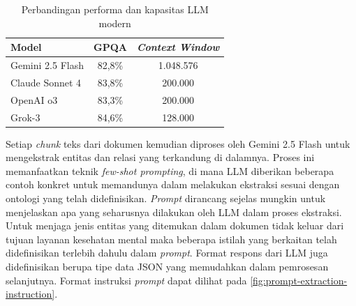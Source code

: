 \begin{table}[ht]
	\centering
	\label{tab:llm-comparison}
	\caption{Perbandingan performa dan kapasitas LLM modern}
	\begin{tabular}{|l|c|c|}
		\hline
		\textbf{Model}   & \textbf{GPQA} & \textbf{\textit{Context Window}} \\
		\hline \hline
		Gemini 2.5 Flash & 82,8\%        & 1.048.576                        \\
		\hline
		Claude Sonnet 4  & 83,8\%        & 200.000                          \\
		\hline
		OpenAI o3        & 83,3\%        & 200.000                          \\
		\hline
		Grok-3           & 84,6\%        & 128.000                          \\
		\hline
	\end{tabular}
\end{table}

Setiap \textit{chunk} teks dari dokumen kemudian diproses oleh Gemini 2.5 Flash untuk mengekstrak entitas dan relasi yang terkandung di dalamnya.
Proses ini memanfaatkan teknik \textit{few-shot prompting}, di mana LLM diberikan beberapa contoh konkret untuk memandunya dalam melakukan ekstraksi sesuai dengan ontologi yang telah didefinisikan.
\textit{Prompt} dirancang sejelas mungkin untuk menjelaskan apa yang seharusnya dilakukan oleh LLM dalam proses ekstraksi.
Untuk menjaga jenis entitas yang ditemukan dalam dokumen tidak keluar dari tujuan layanan kesehatan mental maka beberapa istilah yang berkaitan telah didefinisikan terlebih dahulu dalam \textit{prompt}.
Format respons dari LLM juga didefinisikan berupa tipe data JSON yang memudahkan dalam pemrosesan selanjutnya. Format instruksi \textit{prompt} dapat dilihat pada \ref{fig:prompt-extraction-instruction}.

